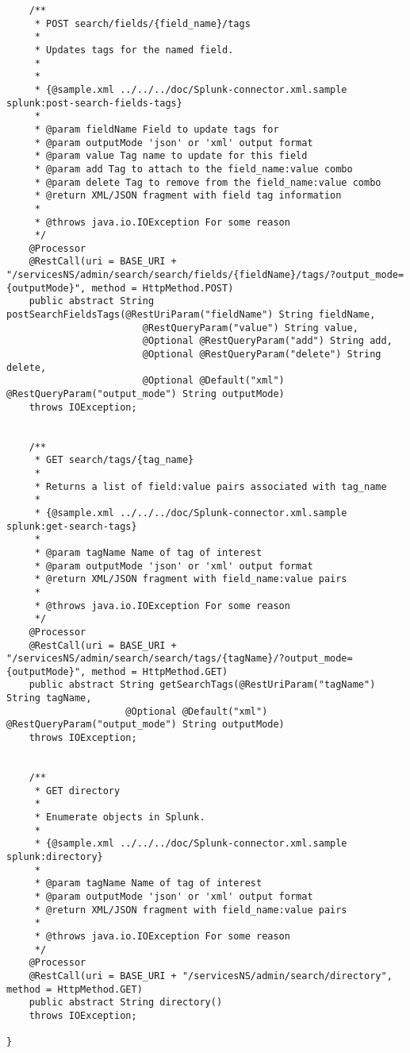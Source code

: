 \begin{lstlisting}
    /**
     * POST search/fields/{field_name}/tags
     *
     * Updates tags for the named field.
     *
     * 
     * {@sample.xml ../../../doc/Splunk-connector.xml.sample splunk:post-search-fields-tags}
     *
     * @param fieldName Field to update tags for
     * @param outputMode 'json' or 'xml' output format
     * @param value Tag name to update for this field
     * @param add Tag to attach to the field_name:value combo
     * @param delete Tag to remove from the field_name:value combo
     * @return XML/JSON fragment with field tag information
     *
     * @throws java.io.IOException For some reason
     */
    @Processor
    @RestCall(uri = BASE_URI + "/servicesNS/admin/search/search/fields/{fieldName}/tags/?output_mode={outputMode}", method = HttpMethod.POST)
    public abstract String postSearchFieldsTags(@RestUriParam("fieldName") String fieldName,
						@RestQueryParam("value") String value,
						@Optional @RestQueryParam("add") String add,
						@Optional @RestQueryParam("delete") String delete,
						@Optional @Default("xml") @RestQueryParam("output_mode") String outputMode) 
	throws IOException;


    /**
     * GET search/tags/{tag_name}
     *
     * Returns a list of field:value pairs associated with tag_name
     *
     * {@sample.xml ../../../doc/Splunk-connector.xml.sample splunk:get-search-tags}
     *
     * @param tagName Name of tag of interest
     * @param outputMode 'json' or 'xml' output format
     * @return XML/JSON fragment with field_name:value pairs
     *
     * @throws java.io.IOException For some reason
     */
    @Processor
    @RestCall(uri = BASE_URI + "/servicesNS/admin/search/search/tags/{tagName}/?output_mode={outputMode}", method = HttpMethod.GET)
    public abstract String getSearchTags(@RestUriParam("tagName") String tagName,
					 @Optional @Default("xml") @RestQueryParam("output_mode") String outputMode) 
	throws IOException;


    /**
     * GET directory
     *
     * Enumerate objects in Splunk.
     *
     * {@sample.xml ../../../doc/Splunk-connector.xml.sample splunk:directory}
     *
     * @param tagName Name of tag of interest
     * @param outputMode 'json' or 'xml' output format
     * @return XML/JSON fragment with field_name:value pairs
     *
     * @throws java.io.IOException For some reason
     */
    @Processor
    @RestCall(uri = BASE_URI + "/servicesNS/admin/search/directory", method = HttpMethod.GET)
    public abstract String directory()
	throws IOException;

}


\end{lstlisting}
